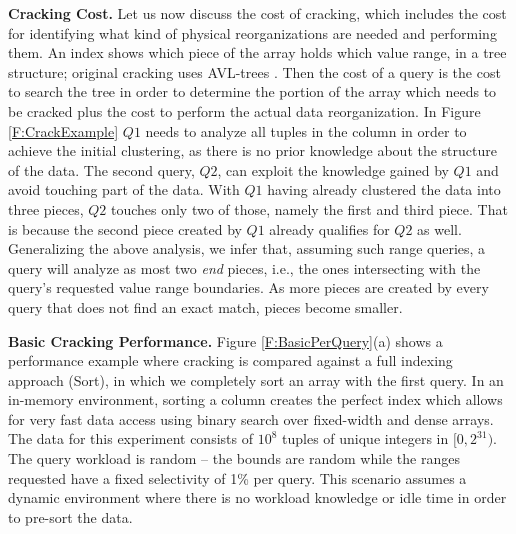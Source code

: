 \documentclass{sig-alternate}
\begin{document}
\textbf{Cracking Cost.} Let us now discuss the cost of cracking, which includes the cost for identifying what kind of physical reorganizations are needed and performing them. An index shows which piece of the array holds which value range, in a tree structure; original cracking uses AVL-trees \cite{IKM:CIDR07}. Then the cost of a query is the cost to search the tree in order to determine the portion of the array which needs to be cracked plus the cost to perform the actual data reorganization. In Figure \ref{F:CrackExample} $Q1$ needs to analyze all tuples in the column in order to achieve the initial clustering, as there is no prior knowledge about the structure of the data. The second query, $Q2$, can exploit the knowledge gained by $Q1$ and avoid touching part of the data. With $Q1$ having already clustered the data into three pieces, $Q2$ touches only two of those, namely the first and third piece. That is because the second piece created by $Q1$ already qualifies for $Q2$ as well. Generalizing the above analysis, we infer that, assuming such range queries, a query will analyze as most two \emph{end} pieces, i.e., the ones intersecting with the query's requested value range boundaries. As more pieces are created by every query that does not find an exact match, pieces become smaller.

\textbf{Basic Cracking Performance.}
Figure \ref{F:BasicPerQuery}(a) shows a performance example where cracking is compared against
a full indexing approach ({\sf Sort}), in which we completely sort an array with the first query. In an in-memory environment, sorting a column creates the perfect index which allows for very fast
data access using binary search over fixed-width and dense arrays. The data for this experiment consists of $10^8$ tuples of unique integers in $[0,2^{31})$. The query workload is random -- the bounds are random while the ranges requested have a fixed selectivity of 1\% per query. This scenario assumes a dynamic environment where there is no workload knowledge or idle time in order to pre-sort the data.
\end{document}
